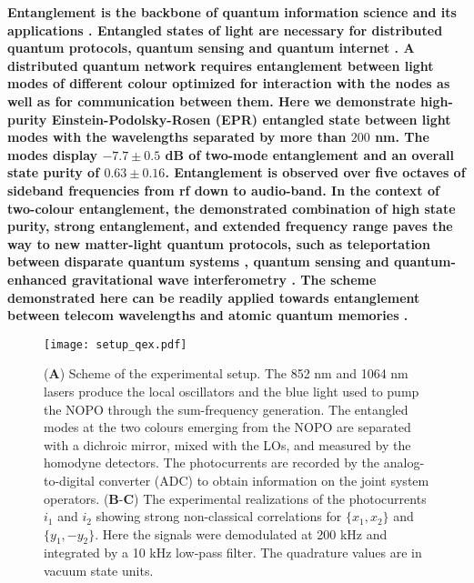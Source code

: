 \documentclass[final,twocolumn,english,prl,notitlepage,nofootinbib,floatfix,longbibliography,superscriptaddress
]{revtex4-2}
\begin{document}
\maketitle
\textbf{Entanglement is the backbone of quantum information science and its applications \cite{Nielsen2010}. Entangled states of light are necessary for distributed quantum protocols, quantum sensing \cite{Giovannetti2011} and quantum internet \cite{Kimble2008}. A distributed quantum network requires entanglement between light modes of different colour optimized for interaction with the nodes as well as for communication between them. 
Here we demonstrate high-purity Einstein-Podolsky-Rosen (EPR) entangled state between light modes with the wavelengths separated by more than $200$ nm. The modes display $-7.7\pm0.5$ dB of two-mode entanglement and an overall state purity of $0.63\pm0.16$. Entanglement is observed over five octaves of sideband frequencies from rf down to audio-band. In the context of two-colour entanglement, the demonstrated combination of high state purity, strong entanglement, and extended frequency range paves the way to new matter-light quantum protocols, such as  teleportation between disparate quantum systems \cite{Pirandola2015}, quantum sensing \cite{Giovannetti2011,Lawrie2019,Degen2017} and quantum-enhanced gravitational wave interferometry \cite{Khalili2018,Zeuthen2019}. The scheme demonstrated here can be readily applied towards entanglement between telecom wavelengths and atomic quantum
memories \cite{Duan2001,Hammerer2010}.}\par
\begin{figure*}[ht]
\texttt{[image: setup\_qex.pdf]}
\caption{(\textbf{A}) Scheme of the experimental setup. The 852 nm and 1064 nm lasers produce the local oscillators and the blue light used to pump the NOPO through the sum-frequency generation. The entangled modes at the two colours emerging from the NOPO are separated with a dichroic mirror, mixed with the LOs, and measured by the homodyne detectors. The photocurrents are recorded by the analog-to-digital converter (ADC) to obtain information on the joint system operators. (\textbf{B}-\textbf{C}) The experimental realizations of the photocurrents $i_1$ and $i_2$ showing strong non-classical correlations for $\{x_1,x_2\}$ and $\{y_1,-y_2\}$. Here the signals were demodulated at 200 kHz and integrated by a 10 kHz low-pass filter. The quadrature values are in vacuum state units.}
\label{fig:setup}
\end{figure*}
\end{document}
